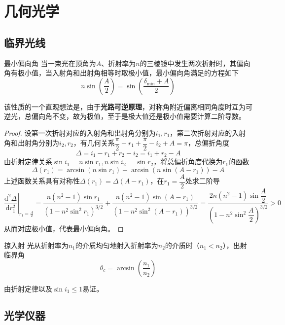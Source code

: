 \chapter{几何光学}





\section{临界光线}

\begin{myprop}{ 最小偏向角}{}
	当一束光在顶角为$A$、折射率为$n$的三棱镜中发生两次折射时，其偏向角有极小值，当入射角和出射角相等时取极小值，最小偏向角满足的方程如下
    \[
        n\sin\left(\dfrac{A}{2}\right)=\sin\left(\dfrac{\delta_{\min}+A}{2}\right)
    \]
\end{myprop}
该性质的一个直观想法是，由于\textbf{光路可逆原理}，对称角附近偏离相同角度时互为可逆光，总偏向角不变，故为极值，至于是极大值还是极小值需要计算二阶导数。
\begin{proof}
    设第一次折射对应的入射角和出射角分别为$i_1,r_1$，第二次折射对应的入射角和出射角分别为$i_2,r_2$，有几何关系$\dfrac{\pi}{2}-r_1+\dfrac
    {\pi}{2}-i_2+A=\pi$，总偏折角度
    \[
        \Delta = i_1-r_1+r_2-i_2=i_1+r_2-A
    \]
    由折射定律关系$\sin i_1=n\sin r_1,n\sin i_2=\sin r_2$，将总偏折角度代换为$r_1$的函数
    \[
        \Delta(r_1)=\arcsin(n\sin r_1)+\arcsin(n\sin (A-r_1))-A    
    \]
    上述函数关系具有对称性$\Delta(r_1)=\Delta(A-r_1)$，在$r_1=\dfrac{A}{2}$处求二阶导
    \[
        \left.\dfrac{\mathrm{d}^2\Delta}{\mathrm{d}r_1^2}\right|_{r_1=\frac{A}{2}}=\frac{n \left(n^2-1\right) \sin r_1}{\left(1-n^2 \sin ^2 r_1\right)^{3/2}}+\frac{n \left(n^2-1\right) \sin (A-r_1)}{\left(1-n^2 \sin ^2 (A-r_1)\right)^{3/2}}=\frac{2n \left(n^2-1\right) \sin \dfrac{A}{2}}{\left(1-n^2 \sin ^2 \dfrac{A}{2}\right)^{3/2}}>0
    \]
    从而对应极小值，代表最小偏向角。
\end{proof}

\begin{myprop}{ 掠入射}{}
	光从折射率为$n_1$的介质均匀地射入折射率为$n_2$的介质时（$n_1<n_2$），出射临界角
    \[
        \theta_{c}=\arcsin\left(\dfrac{n_1}{n_2}\right)
    \]
\end{myprop}
由折射定律以及$\sin i_1\leq 1$易证。
\section{光学仪器}

